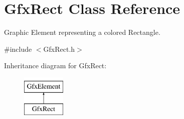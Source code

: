 \hypertarget{classGfxRect}{\section{Gfx\-Rect Class Reference}
\label{classGfxRect}
}


Graphic Element representing a colored Rectangle.  




{\ttfamily \#include $<$Gfx\-Rect.\-h$>$}

Inheritance diagram for Gfx\-Rect\-:\begin{figure}[H]
\begin{center}
\leavevmode
\includegraphics[height=2.000000cm]{classGfxRect}
\end{center}
\end{figure}
